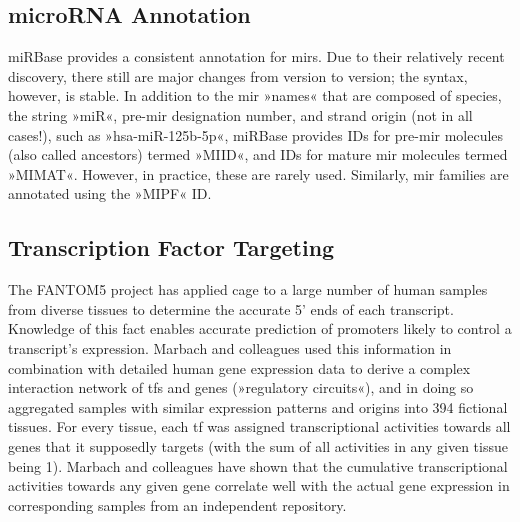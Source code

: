 \subsection{microRNA Annotation}
miRBase provides a consistent annotation for \acp{mir}. Due to their relatively recent discovery, there still are major changes from version to version; the syntax, however, is stable. In addition to the \ac{mir} »names« that are composed of species, the string »miR«, pre-\ac{mir} designation number, and strand origin (not in all cases!), such as »hsa-miR-125b-5p«, miRBase provides IDs for pre-\ac{mir} molecules (also called ancestors) termed »MIID«, and IDs for mature \ac{mir} molecules termed »MIMAT«. However, in practice, these are rarely used. Similarly, \ac{mir} families are annotated using the »MIPF« ID.

\subsection{Transcription Factor Targeting} \label{sec:database:tf}
The FANTOM5 project has applied \ac{cage} to a large number of human samples from diverse tissues to determine the accurate 5' ends of each transcript.\cite{Hon2017} Knowledge of this fact enables accurate prediction of promoters likely to control a transcript's expression. Marbach and colleagues used this information in combination with detailed human gene expression data to derive a complex interaction network of \acp{tf} and genes (»regulatory circuits«), and in doing so aggregated samples with similar expression patterns and origins into 394 fictional tissues.\cite{Marbach2016} For every tissue, each \ac{tf} was assigned transcriptional activities towards all genes that it supposedly targets (with the sum of all activities in any given tissue being \num{1}). Marbach and colleagues have shown that the cumulative transcriptional activities towards any given gene correlate well with the actual gene expression in corresponding samples from an independent repository.

